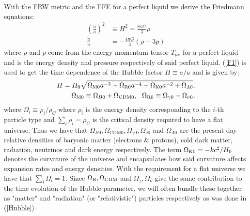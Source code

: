 \documentclass[%
reprint,
 amsmath,amssymb,
 aps,
]{revtex4-2}
\begin{document}
With the FRW metric and the EFE for a perfect liquid we derive the Friedmann equations:
\begin{align}
	\label{F1}
	\left(\frac{\dot{a}}{a}\right)^2&\equiv H^2=\frac{8\pi G}{3}\rho\\
	\label{F2}
	\frac{\ddot{a}}{a}&=-\frac{4\pi G}{3}(\rho+3p)
\end{align}
where $\rho$ and $p$ come from the energy-momentum tensor $T_{\mu\nu}$ for a perfect liquid and is the energy density and pressure respectively of said perfect liquid. (\ref{F1}) is used to get the time dependence of the Hubble factor $H\equiv\dot{a}/a$ and is given by:
\begin{align}
	H=H_0\sqrt{\Omega_{\text M0}a^{-3}+\Omega_{\text{R}0}a^{-4}+\Omega_{\text K0}a^{-2}+\Omega_{\Lambda0}}, \label{Hubble}\\
	\Omega_{\text M0}\equiv \Omega_{B0}+\Omega_{\text{CDM}0},~~\Omega_{\text{R}0}\equiv \Omega_{\gamma0}+\Omega_{\nu0},\nonumber
\end{align}
where $\Omega_i\equiv\rho_i/\rho_C$ where $\rho_i$ is the energy density corresponding to the $i$-th particle type and $\sum_i\rho_i=\rho_C$ is the critical density required to have a flat universe. Thus we have that $\Omega_{B0},\Omega_{\text{CDM}0},\Omega_{\gamma0},\Omega_{\nu0}$ and $\Omega_{\Lambda0}$ are the present day relative densities of baryonic matter (electrons \& protons), cold dark matter, radiation, neutrinos and dark energy respectively. The term $\Omega_{\text K0}=-kc^2/H_0$ denotes the curvature of the universe and encapsulates how said curvature affects expansion rates and energy densities. With the requirement for a flat universe we have that $\sum_i\Omega_i=1$. Since $\Omega_{\text B},\Omega_{\text{CDM}}$ and $\Omega_\gamma,\Omega_\nu$ give the same contribution to the time evolution of the Hubble parameter, we will often bundle these together as "matter" and "radiation" (or "relativistic") particles respectively as was done in (\ref{Hubble}).
\end{document}

